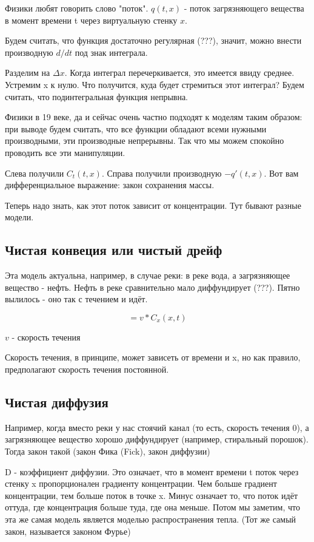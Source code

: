 Физики любят говорить слово "поток". $q(t,x)$ - поток загрязняющего вещества в момент времени t через виртуальную стенку $x$.


Будем считать, что функция достаточно регулярная (???), значит, можно внести производную $d/dt$ под знак интеграла.


Разделим на $\Delta x$. Когда интеграл перечеркивается, это имеется ввиду среднее.
Устремим x к нулю. Что получится, куда будет стремиться этот интеграл? Будем считать, что подинтегральная функция непрывна.

Физики в 19 веке, да и сейчас очень частно подходят к моделям таким образом: при выводе будем считать, что все функции обладают всеми нужными производными, эти производные непрерывны. Так что мы можем спокойно проводить все эти манипуляции.

Слева получили $C_t(t,x)$. Справа получили производную $-q'(t,x)$.
Вот вам дифференциальное выражение: закон сохранения массы.

Теперь надо знать, как этот поток зависит от концентрации. Тут бывают разные модели.
\subsection{Чистая конвеция или чистый дрейф}
Эта модель актуальна, например, в случае реки: в реке вода, а загрязняющее вещество - нефть. Нефть в реке сравнительно мало диффундирует (???). Пятно вылилось - оно так с течением и идёт.

$$  = v * C_x(x,t)$$

$v$ - скорость течения

Скорость течения, в принципе, может зависеть от времени и x, но как правило, предполагают скорость течения постоянной.

\subsection{Чистая диффузия}

Например, когда вместо реки у нас стоячий канал (то есть, скорость течения 0), а загрязняющее вещество хорошо диффундирует (например, стиральный порошок). Тогда закон такой (закон Фика (Fick), закон диффузии)


D - коэффициент диффузии.
Это означает, что в момент времени t поток через стенку x пропорционален градиенту концентрации. Чем больше градиент концентрации, тем больше поток в точке x. Минус означает то, что поток идёт оттуда, где концентрация больше туда, где она меньше. Потом мы заметим, что эта же самая модель является моделью распространения тепла. (Тот же самый закон, называется законом Фурье)

